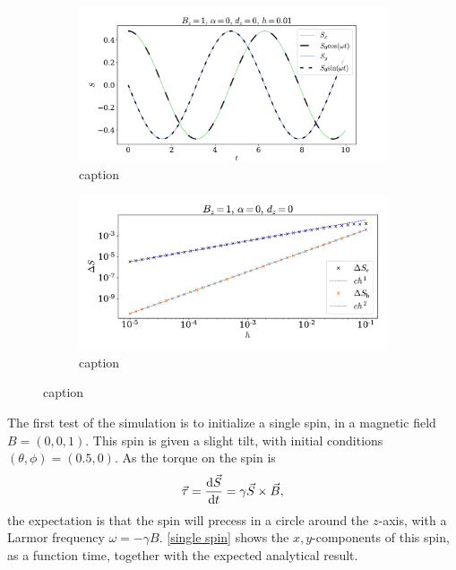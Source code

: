 \documentclass{article}
\begin{document}
    \begin{figure}[H]
        \centering
        \begin{subfigure}{.53\textwidth}             
            \includegraphics[width=\textwidth]{../plots/single.pdf}
            \caption{caption}
            \label{single spin}
        \end{subfigure}
        \begin{subfigure}{.46\textwidth}                    
            \centering
            \includegraphics[width=\textwidth]{../plots/err.pdf}
            \caption{caption}
            \label{error}
        \end{subfigure}
    \end{figure}
    
    The first test of the simulation is to initialize a single spin, in a magnetic field $B = (0, 0, 1)$. This spin is given a slight tilt, with initial conditions $(\theta, \phi) = (0.5, 0)$. As the torque on the spin is 
    \begin{equation*}
        \vec \tau = \dv{\vec S}{t} = \gamma \vec{S} \times \vec{B},
    \end{equation*}
    the expectation is that the spin will precess in a circle around the $z$-axis, with a Larmor frequency $\omega = -\gamma B$. \autoref{single spin} shows the $x,y$-components of this spin, as a function time, together with the expected analytical result.
\end{document}

